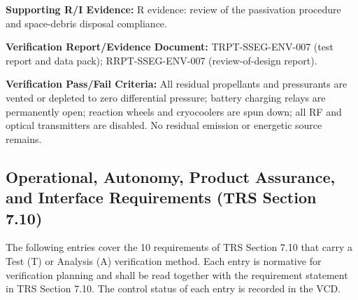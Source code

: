 \par\textbf{Supporting R/I Evidence:} R evidence: review of the passivation procedure and space-debris disposal compliance.
\par\textbf{Verification Report/Evidence Document:} TRPT-SSEG-ENV-007 (test report and data pack); RRPT-SSEG-ENV-007 (review-of-design report).
\par\textbf{Verification Pass/Fail Criteria:} All residual propellants and pressurants are vented or depleted to zero differential pressure; battery charging relays are permanently open; reaction wheels and cryocoolers are spun down; all RF and optical transmitters are disabled. No residual emission or energetic source remains.
\par\medskip
\subsection{Operational, Autonomy, Product Assurance, and Interface Requirements (TRS Section 7.10)}
The following entries cover the 10 requirements of TRS Section 7.10 that carry a Test (T) or Analysis (A) verification method. Each entry is normative for verification planning and shall be read together with the requirement statement in TRS Section 7.10. The control status of each entry is recorded in the VCD.
